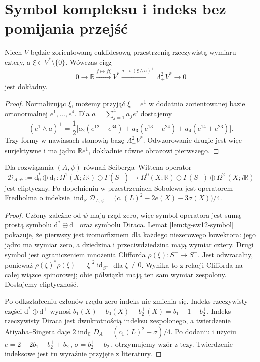 \section{Symbol kompleksu i indeks bez pomijania przejść}
\label{sec:tg-sw12-symbol}

\begin{lemat}
\label{lem:tg-sw12-symbol}
Niech $V$ będzie zorientowaną euklidesową przestrzenią
rzeczywistą wymiaru cztery, a $\xi\in V^*\setminus\{0\}$.
Wówczas ciąg
\[
0\longrightarrow\mathbb R
\xrightarrow{f\mapsto f\xi}V^*
\xrightarrow{a\mapsto(\xi\wedge a)^+}\Lambda^2_+V^*
\longrightarrow0
\]
jest dokładny.
\end{lemat}

\begin{proof}
Normalizując $\xi$, możemy przyjąć $\xi=e^1$ w dodatnio
zorientowanej bazie ortonormalnej $e^1,\dots,e^4$.
Dla $a=\sum_{j=1}^4a_je^j$ dostajemy
\[
(e^1\wedge a)^+=\frac12\bigl[
 a_2(e^{12}+e^{34})+a_3(e^{13}-e^{24})
 +a_4(e^{14}+e^{23})\bigr].
\]
Trzy formy w nawiasach stanowią bazę $\Lambda^2_+V^*$.
Odwzorowanie drugie jest więc surjektywne i ma jądro
$\mathbb Re^1$, dokładnie równe obrazowi pierwszego.
\end{proof}

\begin{twierdzenie}
\label{thm:tg-sw12-fredholm}
Dla rozwiązania $(A,\psi)$ równań Seiberga--Wittena operator
\[
\mathcal D_{A,\psi}:=\mathrm d_0^*\oplus\mathrm d_1:
\Omega^1(X;i\mathbb R)\oplus\Gamma(S^+)
\longrightarrow
\Omega^0(X;\mathbb R)\oplus\Gamma(S^-)
\oplus\Omega^2_+(X;i\mathbb R)
\]
jest eliptyczny. Po dopełnieniu w przestrzeniach Sobolewa
jest operatorem Fredholma o indeksie
$\operatorname{ind}_\mathbb R\mathcal D_{A,\psi}
=\bigl(c_1(L)^2-2e(X)-3\sigma(X)\bigr)/4$.
\end{twierdzenie}

\begin{proof}
Człony zależne od $\psi$ mają rząd zero, więc symbol
operatora jest sumą prostą symbolu
$\mathrm d^*\oplus\mathrm d^+$ oraz symbolu Diraca.
Lemat \ref{lem:tg-sw12-symbol} pokazuje, że pierwszy jest
izomorfizmem dla każdego niezerowego kowektora: jego jądro
ma wymiar zero, a dziedzina i przeciwdziedzina mają
wymiar cztery. Drugi symbol jest ograniczeniem mnożenia Clifforda
$\rho(\xi)\colon S^+\to S^-$. Jest odwracalny,
ponieważ $\rho(\xi)^*\rho(\xi)=
|\xi|^2\operatorname{id}_{S^+}$ dla $\xi\ne0$.
Wynika to z relacji Clifforda na całej wiązce spinorowej;
obie półwiązki mają ten sam wymiar zespolony.
Dostajemy eliptyczność.

Po odkształceniu członów rzędu zero indeks nie zmienia
się. Indeks rzeczywisty części $\mathrm d^*\oplus\mathrm d^+$
wynosi $b_1(X)-b_0(X)-b_2^+(X)=b_1-1-b_2^+$.
Indeks rzeczywisty Diraca jest dwukrotnością indeksu
zespolonego, a twierdzenie Atiyaha--Singera daje
$2\operatorname{ind}_\mathbb C D_A=(c_1(L)^2-\sigma)/4$.
Po dodaniu i użyciu $e=2-2b_1+b_2^++b_2^-$,
$\sigma=b_2^+-b_2^-$, otrzymujemy wzór z tezy.
Twierdzenie indeksowe jest tu wyraźnie przyjęte z literatury.
\end{proof}

